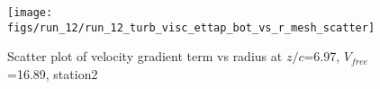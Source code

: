 \begin{figure}[H]
\centering
\texttt{[image: figs/run\_12/run\_12\_turb\_visc\_ettap\_bot\_vs\_r\_mesh\_scatter]}
\caption{Scatter plot of velocity gradient term vs radius at $z/c$=6.97, $V_{free}$=16.89, station2}
\label{fig:run_12_turb_visc_ettap_bot_vs_r_mesh_scatter}
\end{figure}


